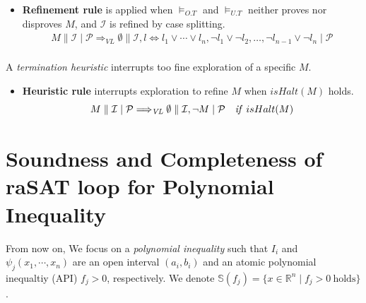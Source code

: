 \documentclass[runningheads,a4paper,oribibl]{llncs}
\newcommand{\Real}{{\mathbb R}}
\newcommand{\suppress}[1]{} %
\begin{document}
\begin{itemize}
\item \textbf{Refinement rule} is applied when $\models_{O.T}$ and $\models_{U.T}$ neither proves nor disproves $M$, 
and ${\mathcal I}$ is refined by case splitting. 
\[
\begin{array}{r}
M \mathrel{\lVert} {\mathcal I} \mathrel{|} {\mathcal P}  \Longrightarrow_{\textit{VL}}  
\emptyset \mathrel{\lVert}  {\mathcal I},  l \Leftrightarrow l_1 \vee \cdots \vee l_n, 
\neg l_1 \vee \neg l_2, \ldots, \neg l_{n-1} \vee \neg l_{n} \mathrel{|} {\mathcal P} \\
\end{array}
\]
\end{itemize}

A \emph{termination heuristic} interrupts too fine exploration of a specific $M$. 

\begin{itemize}
\item \textbf{Heuristic rule} interrupts exploration to refine $M$ when $isHalt(M)$ holds. 
\[
M \mathrel{\lVert} {\mathcal I} \mathrel{|} {\mathcal P}
\Longrightarrow_{\textit{VL}}
\emptyset \mathrel{\lVert}  {\mathcal I}, \neg M \mathrel{|} {\mathcal P}
\quad \mbox{\textit{if} $isHalt(M)$}
\]
\end{itemize} 



\section{Soundness and Completeness of {\bf raSAT} loop for Polynomial Inequality} 
\label{sec:soundness}

From now on, We focus on a \emph{polynomial inequality} such that 
$I_i$ and $\psi_j(x_1,\cdots,x_n)$ are an open interval $(a_i,b_i)$ and 
an atomic polynomial inequaltiy (API) $f_j > 0$, respectively. 
We denote $\mathbb{S}(f_j) = \{x \in \Real^n \mid f_j > 0 ~\text{holds}\}$.

\suppress{
\begin{definition} \label{def:poly}
A polynomial inequality is a bounded quantification 
$\exists x_1 \in I_1 \cdots x_n \in I_n. \psi(x_1,\cdots,x_n)$ 
such that 
\begin{itemize}
\item each $I_i$ is an open interval $x_i \in (a_i,b_i)$, and 
\item $\psi(x_1,\cdots,x_n)$ is a conjunction of $f_j > 0$ 
where $f_j$ is a polynomial over $\{x_1, \cdots, x_n\}$. 
\end{itemize}
$f_i > 0$ is called an atomic polynomial inequality (API). 
We denote $\mathbb{S}(F) = \{x \in \Real^n \mid F ~\text{holds}\}$.
\end{definition}
}
\end{document}
